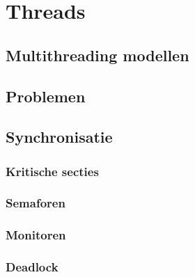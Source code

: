 \chapter{Threads}

\section{Multithreading modellen}

\section{Problemen}

\section{Synchronisatie}

\subsection{Kritische secties}

\subsection{Semaforen}

\subsection{Monitoren}

\subsection{Deadlock}
